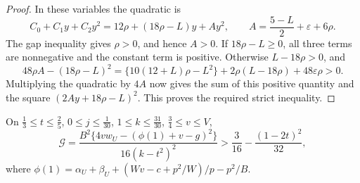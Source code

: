 \begin{proof}
In these variables the quadratic is
\[
 C_0+C_1y+C_2y^2
 =12\rho+(18\rho-L)y+Ay^2,
 \qquad A=\frac{5-L}{2}+\varepsilon+6\rho.
\]
The gap inequality gives $\rho>0$, and hence $A>0$.
If $18\rho-L\ge0$, all three terms are nonnegative and the constant term is positive.
Otherwise $L-18\rho>0$, and
\[
 48\rho A-(18\rho-L)^2
 =\{10(12+L)\rho-L^2\}+2\rho(L-18\rho)+48\varepsilon\rho>0.
\]
Multiplying the quadratic by $4A$ now gives the sum of this positive quantity
and the square $(2Ay+18\rho-L)^2$. This proves the required strict inequality.
\end{proof}

\begin{lemma}\label{lem:m2-envelope}
On $\frac13\le t\le\frac25$, $0\le j\le\frac1{30}$, $1\le k\le\frac{31}{30}$, $\frac34\le v\le V$,
\[
\mathcal G=\frac{B^2\{4vw_U-(\phi(1)+v-g)^2\}}{16(k-t^2)^2}>\frac3{16}-\frac{(1-2t)^2}{32},
\]
where $\phi(1)=\alpha_U+\beta_U+(Wv-c+p^2/W)/p-p^2/B$.
\end{lemma}

